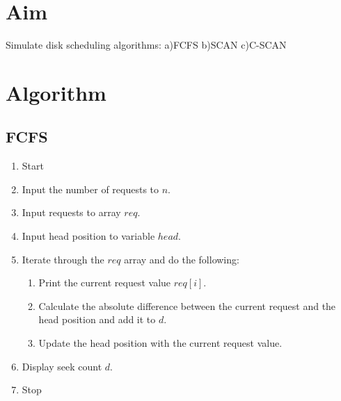 
\section{Aim}
Simulate disk scheduling algorithms: a)FCFS b)SCAN c)C-SCAN

\section{Algorithm}
\subsection{FCFS}
\begin{enumerate}
    \item Start
    \item Input the number of requests to $n$.
    \item Input requests to array $req$.
    \item Input head position to variable $head$.
    \item Iterate through the $req$ array and do the following:
    \begin{enumerate}
        \item Print the current request value $req[i]$.
        \item Calculate the absolute difference between the current request and the head position and add it to $d$.
        \item Update the head position with the current request value.
    \end{enumerate}
    \item Display seek count $d$.
    \item Stop
\end{enumerate}

